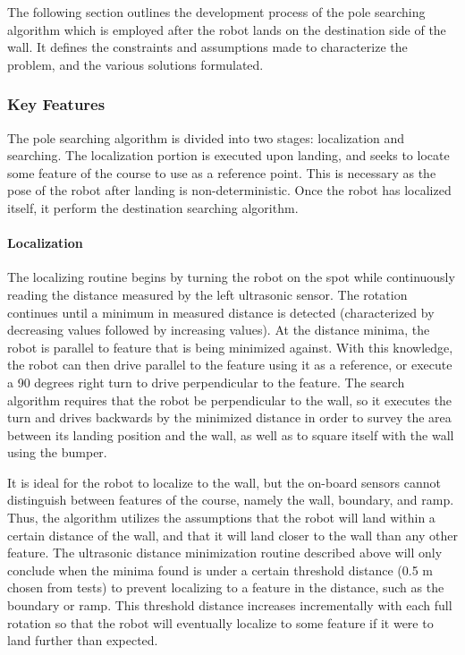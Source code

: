 \documentclass[ece]{uw-wkrpt}
\begin{document}
The following section outlines the development process of the pole searching algorithm which is employed after the robot lands on the destination side of the wall. It defines the constraints and assumptions made to characterize the problem, and the various solutions formulated. 

\subsubsection{Key Features}

The pole searching algorithm is divided into two stages: localization and searching. The localization portion is executed upon landing, and seeks to locate some feature of the course to use as a reference point. This is necessary as the pose of the robot after landing is non-deterministic. Once the robot has localized itself, it perform the destination searching algorithm. 

\paragraph{Localization}

The localizing routine begins by turning the robot on the spot while continuously reading the distance measured by the left ultrasonic sensor. The rotation continues until a minimum in measured distance is detected (characterized by decreasing values followed by increasing values). At the distance minima, the robot is parallel to feature that is being minimized against. With this knowledge, the robot can then drive parallel to the feature using it as a reference, or execute a 90 degrees right turn to drive perpendicular to the feature. The search algorithm requires that the robot be perpendicular to the wall, so it executes the turn and drives backwards by the minimized distance in order to survey the area between its landing position and the wall, as well as to square itself with the wall using the bumper. 

It is ideal for the robot to localize to the wall, but the on-board sensors cannot distinguish between features of the course, namely the wall, boundary, and ramp. Thus, the algorithm utilizes the assumptions that the robot will land within a certain distance of the wall, and that it will land closer to the wall than any other feature. The ultrasonic distance minimization routine described above will only conclude when the minima found is under a certain threshold distance (0.5 m chosen from tests) to prevent localizing to a feature in the distance, such as the boundary or ramp. This threshold distance increases incrementally with each full rotation so that the robot will eventually localize to some feature if it were to land further than expected. 
\end{document}
